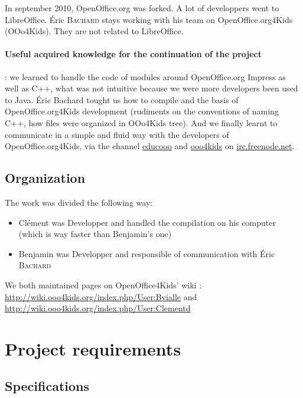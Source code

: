 \documentclass[a4paper,11pt]{article}
\begin{document}
In september 2010, OpenOffice.org was forked. A lot of developpers went to
LibreOffice. Éric \textsc{Bachard} stays working with his team on
OpenOffice.org4Kids (OOo4Kids). They are not related to LibreOffice.

\paragraph{Useful acquired knowledge for the continuation of the project} : we
learned to handle the code of modules around OpenOffice.org Impress as well as
C++, what was not intuitive because we were more developers been used to Java.
Éric Bachard tought us how to compile and the basis of OpenOffice.org4Kids
development (rudiments on the conventions of naming C++, how files were
organized in OOo4Kids tree). And we finally learnt to communicate in a simple
and fluid way with the developers of OpenOffice.org4Kids, via the channel
\url{educooo} and \url{ooo4kids} on \url{irc.freenode.net}.

\subsection*{Organization}

The work was divided the following way:
\begin{itemize}
\item Clément was Developper and handled the compilation on his computer
(which is way faster than Benjamin's one)
\item Benjamin was Developper and responsible of communication with Éric \textsc{Bachard}
\end{itemize}

We both maintained pages on OpenOffice4Kids' wiki :
\url{http://wiki.ooo4kids.org/index.php/User:Bvialle} and
\url{http://wiki.ooo4kids.org/index.php/User:Clementd}

\newpage

\fancyfoot[C]{\thepage}
\section*{Project requirements}

\subsection*{Specifications}
\end{document}

